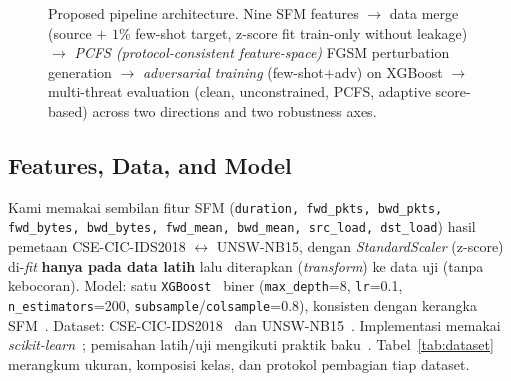 \documentclass[11pt,a4paper]{article}
\begin{document}
\begin{figure}[h]
\centering
\resizebox{0.95\linewidth}{!}{}
\caption{Proposed pipeline architecture. Nine SFM features $\rightarrow$ data merge
(source $+$ $1\%$ few-shot target, z-score fit train-only without leakage)
$\rightarrow$ \emph{PCFS (protocol-consistent feature-space)} FGSM perturbation
generation $\rightarrow$ \emph{adversarial training} (few-shot$+$adv) on XGBoost
$\rightarrow$ multi-threat evaluation (clean, unconstrained, PCFS,
adaptive score-based) across two directions and two robustness axes.}
\label{fig:pipeline}
\end{figure}

\subsection{Features, Data, and Model}
Kami memakai sembilan fitur SFM (\texttt{duration, fwd\_pkts, bwd\_pkts,
fwd\_bytes, bwd\_bytes, fwd\_mean, bwd\_mean, src\_load, dst\_load}) hasil pemetaan
CSE-CIC-IDS2018 $\leftrightarrow$ UNSW-NB15, dengan \emph{StandardScaler} (z-score)
di-\emph{fit} \textbf{hanya pada data latih} lalu diterapkan (\emph{transform}) ke
data uji (tanpa kebocoran). Model: satu \texttt{XGBoost}~\cite{xgboost} biner
(\texttt{max\_depth}=8, \texttt{lr}=0.1, \texttt{n\_estimators}=200,
\texttt{subsample}/\texttt{colsample}=0.8), konsisten dengan kerangka
SFM~\cite{martono2024sfm}. Dataset:
CSE-CIC-IDS2018~\cite{sharafaldin2018} dan UNSW-NB15~\cite{moustafa2015}.
Implementasi memakai \emph{scikit-learn}~\cite{sklearn}; pemisahan latih/uji
mengikuti praktik baku~\cite{kohavi}. Tabel~\ref{tab:dataset} merangkum ukuran,
komposisi kelas, dan protokol pembagian tiap dataset.
\end{document}

